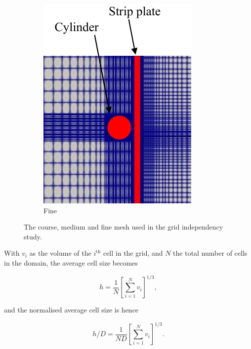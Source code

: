 \documentclass[oneside]{utmthesis}
\begin{document}
\begin{figure}[!h]
\begin{subfigure}[h]{0.3\textwidth}
    \includegraphics[width=\textwidth]{figs/threeGridsFine}
    \caption{Fine}
    \label{fig:fineMesh}
  \end{subfigure}

  \caption{The course, medium and fine mesh used in the grid independency study.} \label{fig:threeGrids}
\end{figure}


With $v_{i}$ as the volume of the $i^{\text{th}}$ cell in the grid, and $N$ the total number of cells in the domain, the average cell size becomes

\begin{equation}
  h = \frac{1}{N} \left [ \sum_{i=1}^{N} v_{i} \right ]^{1/3},
  \label{eq:averageCellSize}
\end{equation}

\noindent and the normalised average cell size is hence

\begin{equation}
  h/D = \frac{1}{ND} \left [ \sum_{i=1}^{N} v_{i} \right ]^{1/3}.
  \label{eq:normAveCellSize}
\end{equation}
\end{document}
